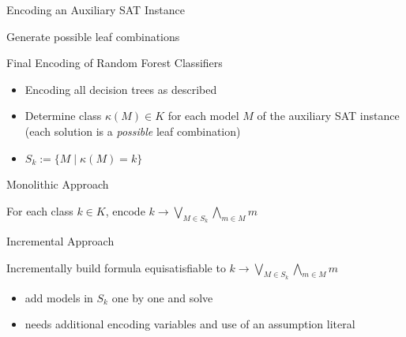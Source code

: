 \documentclass[t]{sdqbeamer}
\begin{document}
\begin{frame}{Encoding an Auxiliary SAT Instance}
\begin{block}{Generate possible leaf combinations}
\begin{center}
\end{center}
\end{block}
\end{frame}


\begin{frame}{Final Encoding of Random Forest Classifiers}

\begin{itemize}
\item Encoding all decision trees as described
\item Determine class $\kappa(M) \in K$ for each model $M$ of the auxiliary SAT instance (each solution is a \emph{possible} leaf combination)
\item $S_k := \{M \mid \kappa(M) = k \}$
\end{itemize}

\begin{block}{Monolithic Approach}

For each class $k \in K$, encode $k \rightarrow \bigvee\limits_{M \in S_k} \bigwedge\limits_{m \in M}m$

\end{block}


\begin{block}{Incremental Approach}

Incrementally build formula equisatisfiable to $k \rightarrow \bigvee\limits_{M \in S_k} \bigwedge\limits_{m \in M}m$

\begin{itemize}
\item add models in $S_k$ one by one and solve
\item needs additional encoding variables and use of an assumption literal
\end{itemize}

\end{block}

\end{frame}
\end{document}
